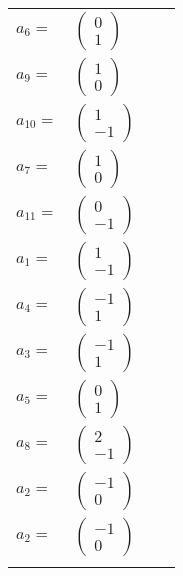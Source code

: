 \documentclass[1p]{elsarticle_modified}
\theoremstyle{definition}
\begin{document}
\begin{tabular}{m{7pt} m{180pt} m{7pt} m{180pt} }
\flushright $a_{6}=$&$\begin{pmatrix}0\\1\end{pmatrix}$ \\
\flushright $a_{9}=$&$\begin{pmatrix}1\\0\end{pmatrix}$ \\
\flushright $a_{10}=$&$\begin{pmatrix}1\\-1\end{pmatrix}$ \\
\flushright $a_{7}=$&$\begin{pmatrix}1\\0\end{pmatrix}$ \\
\flushright $a_{11}=$&$\begin{pmatrix}0\\-1\end{pmatrix}$ \\
\flushright $a_{1}=$&$\begin{pmatrix}1\\-1\end{pmatrix}$ \\
\flushright $a_{4}=$&$\begin{pmatrix}-1\\1\end{pmatrix}$ \\
\flushright $a_{3}=$&$\begin{pmatrix}-1\\1\end{pmatrix}$ \\
\flushright $a_{5}=$&$\begin{pmatrix}0\\1\end{pmatrix}$ \\
\flushright $a_{8}=$&$\begin{pmatrix}2\\-1\end{pmatrix}$ \\
\flushright $a_{2}=$&$\begin{pmatrix}-1\\0\end{pmatrix}$\\ \flushright $a_{2}=$&$\begin{pmatrix}-1\\0\end{pmatrix}$\\&\end{tabular}
\end{document}
